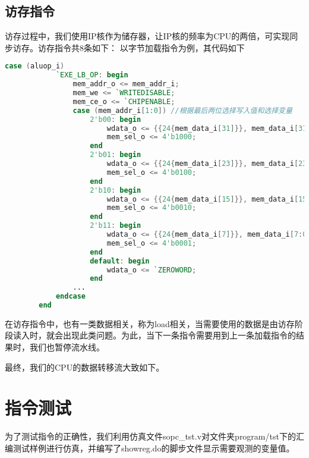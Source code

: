 \subsection{访存指令}
    访存过程中，我们使用IP核作为储存器，让IP核的频率为CPU的两倍，可实现同步访存。访存指令共8条如下：
    以字节加载指令为例，其代码如下
    \begin{lstlisting}[language=Verilog]
        case (aluop_i)
			`EXE_LB_OP: begin
                mem_addr_o <= mem_addr_i;
                mem_we <= `WRITEDISABLE;
                mem_ce_o <= `CHIPENABLE;
                case (mem_addr_i[1:0]) //根据最后两位选择写入值和选择变量
                    2'b00: begin
                        wdata_o <= {{24{mem_data_i[31]}}, mem_data_i[31:24]};
                        mem_sel_o <= 4'b1000;
                    end
                    2'b01: begin
                        wdata_o <= {{24{mem_data_i[23]}}, mem_data_i[23:16]};
                        mem_sel_o <= 4'b0100;
                    end
                    2'b10: begin
                        wdata_o <= {{24{mem_data_i[15]}}, mem_data_i[15:8]};
                        mem_sel_o <= 4'b0010;
                    end
                    2'b11: begin
                        wdata_o <= {{24{mem_data_i[7]}}, mem_data_i[7:0]};
                        mem_sel_o <= 4'b0001;
                    end
                    default: begin
                        wdata_o <= `ZEROWORD;
                    end
                ...
			endcase
        end
    \end{lstlisting}

    在访存指令中，也有一类数据相关，称为load相关，当需要使用的数据是由访存阶段读入时，就会出现此类问题。为此，当下一条指令需要用到上一条加载指令的结果时，我们也暂停流水线。

    最终，我们的CPU的数据转移流大致如下。

\section{指令测试}
    为了测试指令的正确性，我们利用仿真文件sopc\_tst.v对文件夹program/tst下的汇编测试样例进行仿真，并编写了showreg.do的脚步文件显示需要观测的变量值。

